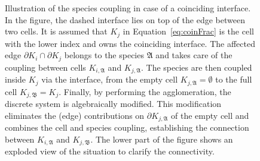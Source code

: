 \documentclass[12pt]{article}
\begin{document}
\begin{figure}[h]
    \centering
    \caption{Illustration of the species coupling in case of a coinciding interface. In the figure, the dashed interface lies on top of the edge between two cells. It is assumed that $K_j$ in Equation~\ref{eq:coinFrac} is the cell with the lower index and owns the coinciding interface. The affected edge $\partial K_i \cap \partial K_j$ belongs to the species $\mathfrak{A}$ and takes care of the coupling between cells $K_{i,\mathfrak{A}}$ and $K_{j,\mathfrak{A}}$. The species are then coupled inside $K_j$ via the interface, from the empty cell $K_{j,\mathfrak{A}} = \emptyset$ to the full cell $K_{j,\mathfrak{B}} = K_j$. Finally, by performing the agglomeration, the discrete system is algebraically modified. This modification eliminates the (edge) contributions on $\partial K_{j,\mathfrak{A}}$ of the empty cell and combines the cell and species coupling, establishing the connection between $K_{i,\mathfrak{A}}$ and $K_{j,\mathfrak{B}}$. The lower part of the figure shows an exploded view of the situation to clarify the connectivity.}
    \label{fig:coupling}
\end{figure}
\end{document}
